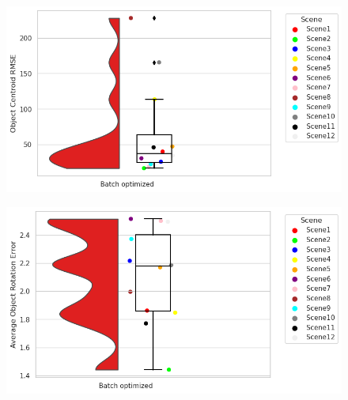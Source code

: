 \documentclass[report.tex]{subfiles}
\begin{document}
\begin{itemize}
\begin{figure}[H]
\centering
\begin{minipage}{.45\textwidth}
  \centering
  \includegraphics[scale=0.45]{Images/Object_Centroid_RMSE.png}
  \label{fig:Object_Centroid_RMSE.png}
\end{minipage}
\begin{minipage}{.45\textwidth}
  \centering
  \includegraphics[scale=0.45]{Images/Average_Object_Rotation_Error.png}
  \label{fig:Average_Object_Rotation_Error.png}
\end{minipage}%
\end{figure}



\end{itemize}
\end{document}
